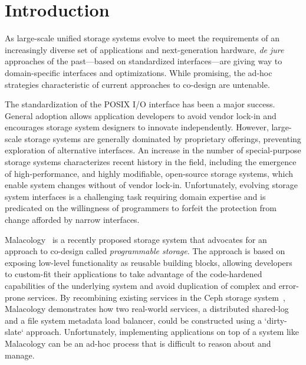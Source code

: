 \section{Introduction}
\label{sec:intro}

As large-scale unified storage systems evolve to meet the requirements 
of an increasingly diverse set of applications and next-generation hardware, \emph{de jure}
approaches of the past---based on standardized interfaces---are giving way to
domain-specific interfaces and optimizations. While promising, the ad-hoc strategies characteristic of 
current approaches to co-design are untenable.

The standardization of the POSIX I/O interface has been a major success. General adoption
allows application developers to avoid vendor lock-in and encourages storage system
designers to innovate independently. However, large-scale storage systems are generally dominated 
by proprietary offerings, preventing exploration of alternative
interfaces. An increase in the number of special-purpose storage systems characterizes recent history
in the field, including the emergence of high-performance, and highly modifiable, open-source storage systems, 
which enable system changes without of vendor lock-in. Unfortunately, evolving storage system
interfaces is a challenging task requiring domain expertise and is predicated on the willingness of
programmers to forfeit the protection from change afforded by narrow
interfaces.

Malacology~\cite{sevilla:eurosys17} is a recently proposed storage system that
advocates for an approach to co-design called \emph{programmable storage}. The
approach is based on exposing low-level functionality as reusable building
blocks, allowing developers to custom-fit their applications to take advantage
of the code-hardened capabilities of the underlying system and avoid
duplication of complex and error-prone services. By recombining existing
services in the Ceph storage system~\cite{weil:osdi2006-ceph}, Malacology demonstrates how two
real-world services, a distributed shared-log and a file system metadata load
balancer, could be constructed using a `dirty-slate` approach. Unfortunately, implementing
applications on top of a system like Malacology can be an ad-hoc process
that is difficult to reason about and manage.


